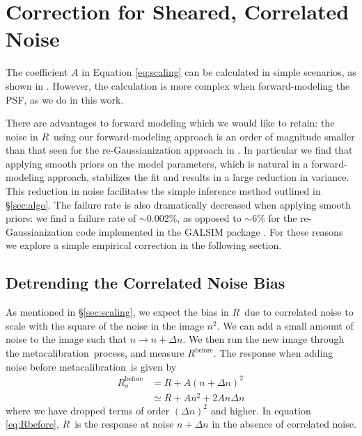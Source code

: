\documentclass[usegraphicx,usenatbib]{mn2e}
\newcommand{\mcal}{metacalibration}
\newcommand{\mcalR}{$R$}
\begin{document}
\section{Correction for Sheared, Correlated Noise} \label{sec:corr}

The coefficient $A$ in Equation \ref{eq:scaling} can be calculated in simple
scenarios, as shown in \cite{HirataCorrNoise}.  However, the calculation is
more complex when forward-modeling the PSF, as we do in this work.

There are advantages to forward modeling which we would like to retain: the
noise in \mcalR\ using our forward-modeling approach is an order of magnitude
smaller than that seen for the re-Gaussianization approach in \cite{HuffMcal}.
In particular we find that applying smooth priors on the model parameters,
which is natural in a forward-modeling approach, stabilizes the fit and results in
a large reduction in variance.  This reduction in noise facilitates the simple
inference method outlined in \S \ref{sec:algo}.  The failure rate is also
dramatically decreased when applying smooth priors:  we find a failure rate of
$\sim$0.002\%, as opposed to $\sim$6\% for the re-Gaussianization code
implemented in the GALSIM package \citep{GALSIM2015}.  For these reasons we
explore a simple empirical correction in the following section.


\subsection{Detrending the Correlated Noise Bias} \label{sec:detrend}

As mentioned in \S \ref{sec:scaling}, we expect the bias in \mcalR\ due to
correlated noise to scale with the square of the noise in the image $n^2$.  We
can add a small amount of noise to the image such that $n \rightarrow n +
\Delta n$. We then run the new image through the \mcal\ process, and measure
$R^{\mathrm{before}}$.
The response when adding noise before \mcal\ is given by
\begin{align}\label{eq:Rbefore}
    R_o^{\mathrm{before}} &= R + A (n + \Delta n)^2 \nonumber \\
       &\simeq R + A n^2 + 2 A n \Delta n
\end{align}
where we have dropped terms of order $(\Delta n)^2$ and higher.  In equation
\ref{eq:Rbefore}, \mcalR\ is the response at noise $n+\Delta n$ in the absence
of correlated noise.  
\end{document}
